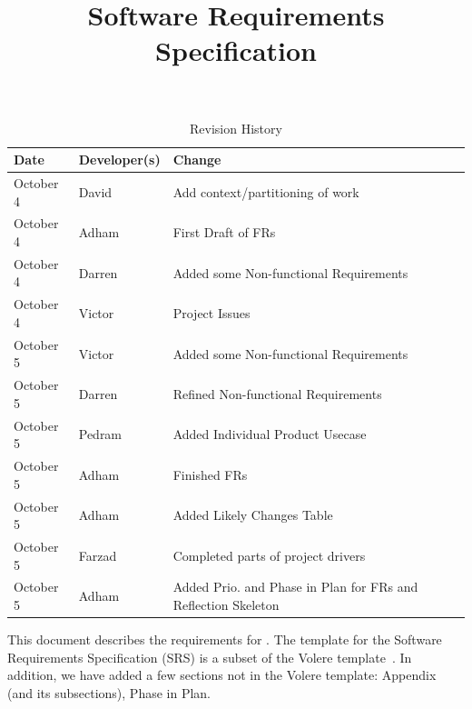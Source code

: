 \documentclass[12pt]{article}
\title{Software Requirements Specification\\\progname}
\author{\authname}
\date{}
\begin{document}
\maketitle

\newpage
{}

\tableofcontents

\newpage

\begin{table}[hp]
\caption{Revision History} \label{TblRevisionHistory}
\begin{tabularx}{\textwidth}{llX}
\toprule
\textbf{Date} & \textbf{Developer(s)} & \textbf{Change}\\
\midrule
October 4 & David & Add context/partitioning of work\\
\midrule
October 4 & Adham & First Draft of FRs\\
\midrule
October 4 & Darren & Added some Non-functional Requirements\\
\midrule
October 4 & Victor & Project Issues\\
\midrule
October 5 & Victor & Added some Non-functional Requirements\\
\midrule
October 5 & Darren & Refined Non-functional Requirements\\
\midrule
October 5 & Pedram & Added Individual Product Usecase\\
\midrule
October 5 & Adham & Finished FRs\\
\midrule
October 5 & Adham & Added Likely Changes Table\\
\midrule
October 5 & Farzad & Completed parts of project drivers\\
\midrule
October 5 & Adham & Added Prio. and Phase in Plan for FRs and Reflection Skeleton\\
\bottomrule
\end{tabularx}
\end{table}

\newpage

\listoftables
\listoffigures

\newpage


This document describes the requirements for \progname. The template for the Software
Requirements Specification (SRS) is a subset of the Volere
template~\cite{RobertsonAndRobertson2012}. In addition, we have added a few sections not
in the Volere template: Appendix (and its subsections), Phase in Plan.

\begin{table}

\end{table}
\end{document}
